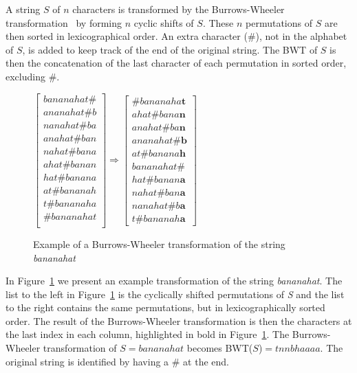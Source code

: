 A string $S$ of $n$ characters is transformed by the Burrows-Wheeler transformation~\citep{BWToriginalArticle} by forming $n$ cyclic shifts of $S$. 
These $n$ permutations of $S$ are then sorted in lexicographical order.
An extra character (\#), not in the alphabet of $S$, is added to keep track of the end of the original string.
The BWT of $S$ is then the concatenation of the last character of each permutation in sorted order, excluding $\#$.

\begin{figure}
\begin{center}
$\begin{bmatrix}
	bananahat\#\\
	ananahat\#b\\
	nanahat\#ba\\
	anahat\#ban\\
	nahat\#bana\\
	ahat\#banan\\
	hat\#banana\\
	at\#bananah\\
	t\#bananaha\\
	\#bananahat\\
\end{bmatrix} \Rightarrow
\begin{bmatrix}
	\#bananaha\textbf{t}\\
	ahat\#bana\textbf{n}\\
	anahat\#ba\textbf{n}\\
	ananahat\#\textbf{b}\\
	at\#banana\textbf{h}\\
	bananahat\#\\
	hat\#banan\textbf{a}\\
	nahat\#ban\textbf{a}\\
	nanahat\#b\textbf{a}\\
	t\#bananah\textbf{a}
\end{bmatrix}$
\end{center}
\caption{Example of a Burrows-Wheeler transformation of the string \textit{bananahat}}
\label{fig:BWTExample}
\end{figure}
In Figure~\ref{fig:BWTExample} we present an example transformation of the string \textit{bananahat}.
The list to the left in Figure~\ref{fig:BWTExample} is the cyclically shifted permutations of \textit{S} and the list to the right contains the same permutations, but in lexicographically sorted order.
The result of the Burrows-Wheeler transformation is then the characters at the last index in each column, highlighted in bold in Figure~\ref{fig:BWTExample}.
The Burrows-Wheeler transformation of $S=bananahat$ becomes BWT($S$)$ = tnnbhaaaa$.
The original string is identified by having a \# at the end.

